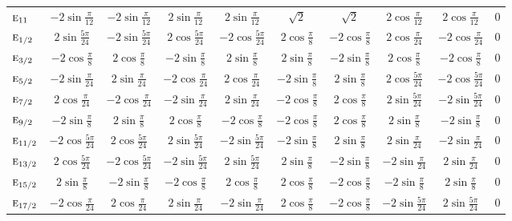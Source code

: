 \documentclass[10pt,a4paper]{article}
\makeatletter
\def\grouprule#1#2{\noalign{\marks\LTgroupmarks{\the\belowrulesep}\nobreak\vskip#1%
  \vskip\aboverulesep}\multispan\LT@cols\unskip{\leaders\hrule\@height#2\hfill\kern\z@}\cr
  \noalign{\penalty\LTrulebreak\vskip\belowrulesep\global\@lastruleclass\z@}}
\numberwithin{equation}{section}
\newcommand{\irr}[1]{\text{\normalfont\scshape #1}}
\makeatother
\begin{document}
{{\begin{longtable}{@{}lccccccccc@{}}
$\irr{e}_{11}$ & $-2\sin\tfrac{\pi}{12}$ & $-2\sin\tfrac{\pi}{12}$ & $2\sin\tfrac{\pi}{12}$ & $2\sin\tfrac{\pi}{12}$ & $\sqrt{2}$ & $\sqrt{2}$ & $2\cos\tfrac{\pi}{12}$ & $2\cos\tfrac{\pi}{12}$ & $0$\\
\grouprule{0pt}{\lightrulewidth}
$\irr{e}_{1/2}$ & $2\sin\tfrac{5\pi}{24}$ & $-2\sin\tfrac{5\pi}{24}$ & $2\cos\tfrac{5\pi}{24}$ & $-2\cos\tfrac{5\pi}{24}$ & $2\cos\tfrac{\pi}{8}$ & $-2\cos\tfrac{\pi}{8}$ & $2\cos\tfrac{\pi}{24}$ & $-2\cos\tfrac{\pi}{24}$ & $0$\\
$\irr{e}_{3/2}$ & $-2\cos\tfrac{\pi}{8}$ & $2\cos\tfrac{\pi}{8}$ & $-2\sin\tfrac{\pi}{8}$ & $2\sin\tfrac{\pi}{8}$ & $2\sin\tfrac{\pi}{8}$ & $-2\sin\tfrac{\pi}{8}$ & $2\cos\tfrac{\pi}{8}$ & $-2\cos\tfrac{\pi}{8}$ & $0$\\
$\irr{e}_{5/2}$ & $-2\sin\tfrac{\pi}{24}$ & $2\sin\tfrac{\pi}{24}$ & $-2\cos\tfrac{\pi}{24}$ & $2\cos\tfrac{\pi}{24}$ & $-2\sin\tfrac{\pi}{8}$ & $2\sin\tfrac{\pi}{8}$ & $2\cos\tfrac{5\pi}{24}$ & $-2\cos\tfrac{5\pi}{24}$ & $0$\\
$\irr{e}_{7/2}$ & $2\cos\tfrac{\pi}{24}$ & $-2\cos\tfrac{\pi}{24}$ & $-2\sin\tfrac{\pi}{24}$ & $2\sin\tfrac{\pi}{24}$ & $-2\cos\tfrac{\pi}{8}$ & $2\cos\tfrac{\pi}{8}$ & $2\sin\tfrac{5\pi}{24}$ & $-2\sin\tfrac{5\pi}{24}$ & $0$\\
$\irr{e}_{9/2}$ & $-2\sin\tfrac{\pi}{8}$ & $2\sin\tfrac{\pi}{8}$ & $2\cos\tfrac{\pi}{8}$ & $-2\cos\tfrac{\pi}{8}$ & $-2\cos\tfrac{\pi}{8}$ & $2\cos\tfrac{\pi}{8}$ & $2\sin\tfrac{\pi}{8}$ & $-2\sin\tfrac{\pi}{8}$ & $0$\\
$\irr{e}_{11/2}$ & $-2\cos\tfrac{5\pi}{24}$ & $2\cos\tfrac{5\pi}{24}$ & $2\sin\tfrac{5\pi}{24}$ & $-2\sin\tfrac{5\pi}{24}$ & $-2\sin\tfrac{\pi}{8}$ & $2\sin\tfrac{\pi}{8}$ & $2\sin\tfrac{\pi}{24}$ & $-2\sin\tfrac{\pi}{24}$ & $0$\\
$\irr{e}_{13/2}$ & $2\cos\tfrac{5\pi}{24}$ & $-2\cos\tfrac{5\pi}{24}$ & $-2\sin\tfrac{5\pi}{24}$ & $2\sin\tfrac{5\pi}{24}$ & $2\sin\tfrac{\pi}{8}$ & $-2\sin\tfrac{\pi}{8}$ & $-2\sin\tfrac{\pi}{24}$ & $2\sin\tfrac{\pi}{24}$ & $0$\\
$\irr{e}_{15/2}$ & $2\sin\tfrac{\pi}{8}$ & $-2\sin\tfrac{\pi}{8}$ & $-2\cos\tfrac{\pi}{8}$ & $2\cos\tfrac{\pi}{8}$ & $2\cos\tfrac{\pi}{8}$ & $-2\cos\tfrac{\pi}{8}$ & $-2\sin\tfrac{\pi}{8}$ & $2\sin\tfrac{\pi}{8}$ & $0$\\
$\irr{e}_{17/2}$ & $-2\cos\tfrac{\pi}{24}$ & $2\cos\tfrac{\pi}{24}$ & $2\sin\tfrac{\pi}{24}$ & $-2\sin\tfrac{\pi}{24}$ & $2\cos\tfrac{\pi}{8}$ & $-2\cos\tfrac{\pi}{8}$ & $-2\sin\tfrac{5\pi}{24}$ & $2\sin\tfrac{5\pi}{24}$ & $0$\\

\end{longtable}}}
\end{document}
